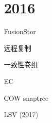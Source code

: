 \chapter{2016}

FusionStor

\begin{enumbox}
\item 远程复制
\item 一致性卷组
\item EC
\item COW snaptree
\item LSV (2017)
\end{enumbox}
